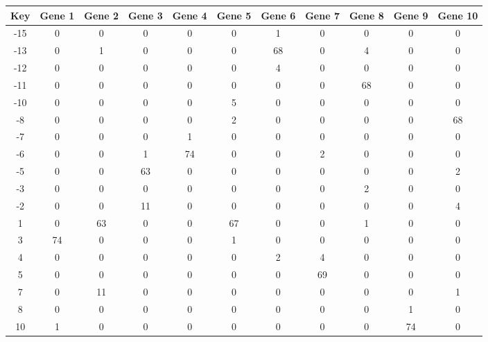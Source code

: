 \begin{tabular}{|c|c|c|c|c|c|c|c|c|c|c|}
\hline
Key & Gene 1 & Gene 2 & Gene 3 & Gene 4 & Gene 5 & Gene 6 & Gene 7 & Gene 8 & Gene 9 & Gene 10 \\
\hline
-15 & 0 & 0 & 0 & 0 & 0 & 1 & 0 & 0 & 0 & 0 \\
-13 & 0 & 1 & 0 & 0 & 0 & 68 & 0 & 4 & 0 & 0 \\
-12 & 0 & 0 & 0 & 0 & 0 & 4 & 0 & 0 & 0 & 0 \\
-11 & 0 & 0 & 0 & 0 & 0 & 0 & 0 & 68 & 0 & 0 \\
-10 & 0 & 0 & 0 & 0 & 5 & 0 & 0 & 0 & 0 & 0 \\
-8 & 0 & 0 & 0 & 0 & 2 & 0 & 0 & 0 & 0 & 68 \\
-7 & 0 & 0 & 0 & 1 & 0 & 0 & 0 & 0 & 0 & 0 \\
-6 & 0 & 0 & 1 & 74 & 0 & 0 & 2 & 0 & 0 & 0 \\
-5 & 0 & 0 & 63 & 0 & 0 & 0 & 0 & 0 & 0 & 2 \\
-3 & 0 & 0 & 0 & 0 & 0 & 0 & 0 & 2 & 0 & 0 \\
-2 & 0 & 0 & 11 & 0 & 0 & 0 & 0 & 0 & 0 & 4 \\
1 & 0 & 63 & 0 & 0 & 67 & 0 & 0 & 1 & 0 & 0 \\
3 & 74 & 0 & 0 & 0 & 1 & 0 & 0 & 0 & 0 & 0 \\
4 & 0 & 0 & 0 & 0 & 0 & 2 & 4 & 0 & 0 & 0 \\
5 & 0 & 0 & 0 & 0 & 0 & 0 & 69 & 0 & 0 & 0 \\
7 & 0 & 11 & 0 & 0 & 0 & 0 & 0 & 0 & 0 & 1 \\
8 & 0 & 0 & 0 & 0 & 0 & 0 & 0 & 0 & 1 & 0 \\
10 & 1 & 0 & 0 & 0 & 0 & 0 & 0 & 0 & 74 & 0 \\
\hline
\end{tabular}